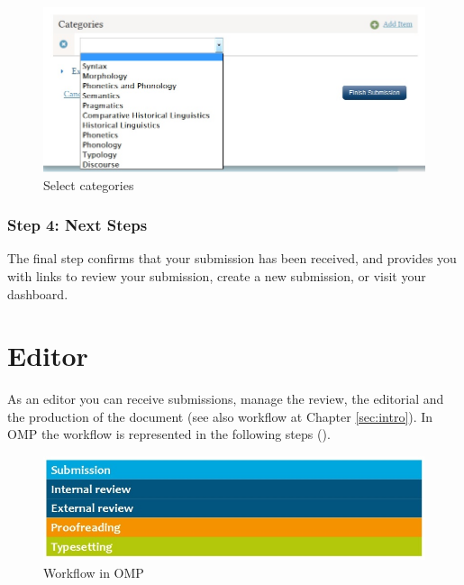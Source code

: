 \begin{figure}[h] \centering 
\includegraphics[width=1\textwidth]{./img/submission-7.jpg} 
\caption{Select categories}
\label{fig:submission7}
\end{figure}

\subsection*{Step 4: Next Steps}

The final step confirms that your submission has been received, and provides you with links to review your submission, create a new submission, or visit your dashboard. 





\chapter{Editor} \label{sec:editor}

As an editor you can receive submissions, manage the review, the editorial and the production of the document (see also workflow at Chapter \ref{sec:intro}). In OMP the workflow is represented in the following steps ().

\begin{figure}[h] \centering
\includegraphics[width=1\textwidth]{./img/workflow_omp.jpg} \caption{Workflow in OMP}
\label{fig:workflowOmp}
\end{figure}

